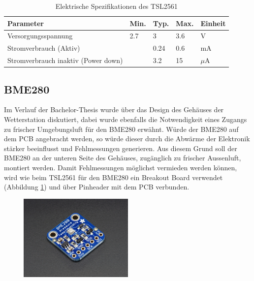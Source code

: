 \begin{table}[h]
  \centering
  \caption{Elektrische Spezifikationen des TSL2561 \cite{TSL2561}}
    \begin{tabular}{lllll}
    \toprule
    \textbf{Parameter} & \textbf{Min.} & \textbf{Typ.} & \textbf{Max.} & \textbf{Einheit} \\
    \midrule
    Versorgungsspannung & 2.7  & 3   & 3.6   & V \\
    Stromverbrauch (Aktiv) &       & 0.24   & 0.6   & mA \\
    Stromverbrauch inaktiv (Power down) &       & 3.2   & 15 & $\mu$A \\
    \bottomrule
    \end{tabular}%
  \label{tab:TSL2561}%
\end{table}%

\subsection{BME280}
Im Verlauf der Bachelor-Thesis wurde über das Design des Gehäuses der Wetterstation diskutiert, dabei wurde ebenfalls die Notwendigkeit eines Zugangs zu frischer Umgebungsluft für den BME280 erwähnt. Würde der BME280 auf dem PCB angebracht werden, so würde dieser durch die Abwärme der Elektronik stärker beeinflusst und Fehlmessungen generieren. Aus diesem Grund soll der BME280 an der unteren Seite des Gehäuses, zugänglich zu frischer Aussenluft, montiert werden. Damit Fehlmessungen möglichst vermieden werden können, wird wie beim TSL2561 für den BME280 ein Breakout Board verwendet (Abbildung \ref{fig:BME_Breakout}) und über Pinheader mit dem PCB verbunden.\\

\begin{figure}[hbtp]
\centering
\includegraphics[width=0.5\textwidth]{graphics/BME280/BME280_Breakout.JPG}
\label{fig:BME_Breakout}
\end{figure}